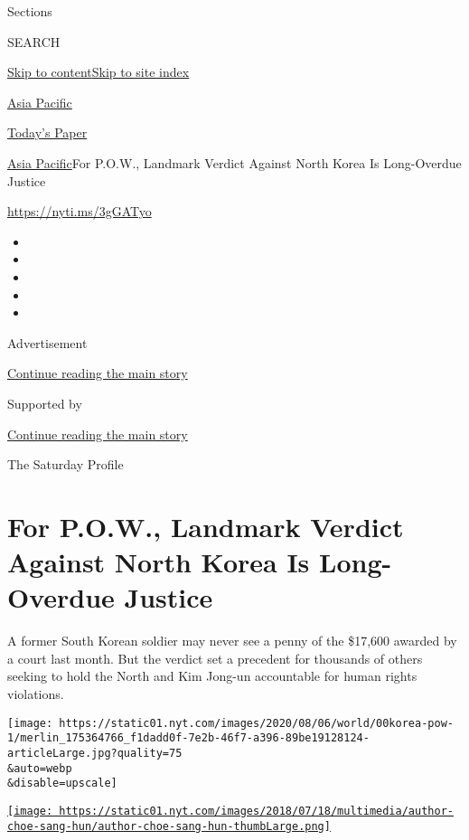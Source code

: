 Sections

SEARCH

\protect\hyperlink{site-content}{Skip to
content}\protect\hyperlink{site-index}{Skip to site index}

\href{https://www.nytimes.com/section/world/asia}{Asia Pacific}

\href{https://myaccount.nytimes.com/auth/login?response_type=cookie\&client_id=vi}{}

\href{https://www.nytimes.com/section/todayspaper}{Today's Paper}

\href{/section/world/asia}{Asia Pacific}\textbar{}For P.O.W., Landmark
Verdict Against North Korea Is Long-Overdue Justice

\href{https://nyti.ms/3gGATyo}{https://nyti.ms/3gGATyo}

\begin{itemize}
\item
\item
\item
\item
\item
\end{itemize}

Advertisement

\protect\hyperlink{after-top}{Continue reading the main story}

Supported by

\protect\hyperlink{after-sponsor}{Continue reading the main story}

The Saturday Profile

\hypertarget{for-pow-landmark-verdict-against-north-korea-is-long-overdue-justice}{%
\section{For P.O.W., Landmark Verdict Against North Korea Is
Long-Overdue
Justice}\label{for-pow-landmark-verdict-against-north-korea-is-long-overdue-justice}}

A former South Korean soldier may never see a penny of the \$17,600
awarded by a court last month. But the verdict set a precedent for
thousands of others seeking to hold the North and Kim Jong-un
accountable for human rights violations.

\texttt{[image: https://static01.nyt.com/images/2020/08/06/world/00korea-pow-1/merlin\_175364766\_f1dadd0f-7e2b-46f7-a396-89be19128124-articleLarge.jpg?quality=75\\\&auto=webp\\\&disable=upscale]}

\href{https://www.nytimes.com/by/choe-sang-hun}{\texttt{[image: https://static01.nyt.com/images/2018/07/18/multimedia/author-choe-sang-hun/author-choe-sang-hun-thumbLarge.png]}}

